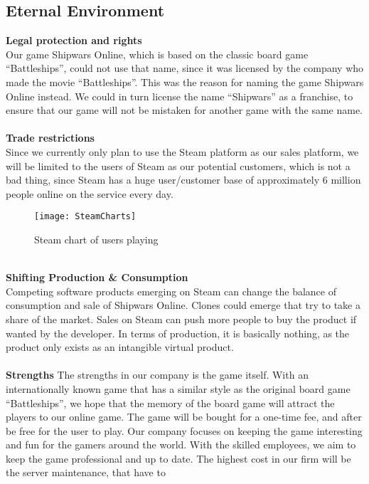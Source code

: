 	\subsection{Eternal Environment}
	\textbf{Legal protection and rights}
	\\
	Our game Shipwars Online, which is based on the classic board game
   “Battleships”, could not use that name, since it was licensed by the
   company who made the movie “Battleships”. This was the reason for naming
    the game Shipwars Online instead. We could in turn license the name
     “Shipwars” as a franchise, to ensure that our game will not be mistaken
      for another game with the same name.
	\\
	\\
	\textbf{Trade restrictions}
	\\
	Since we currently only plan to use the Steam platform as our sales
  platform, we will be limited to the users of Steam as our potential
  customers, which is not a bad thing, since Steam has a huge user/customer
  base of approximately 6 million people online on the service every day.
	\\
	\begin{figure}[h]
	\centerline{\texttt{[image: SteamCharts]}}
	\caption{Steam chart of users playing}
	\end{figure}
	\\
	\textbf{Shifting Production \& Consumption}
	\\
	Competing software products emerging on Steam can change the balance of
   consumption and sale of Shipwars Online. Clones could emerge that try to
    take a share of the market. Sales on Steam can push more people to buy
    the product if wanted by the developer. In terms of production, it is
    basically nothing, as the product only exists as an intangible virtual
     product.
	\\
	\\
	\textbf{Strengths}
	The strengths in our company is the game itself. With an internationally
  known game that has a similar style as the original board game
  “Battleships”, we hope that the memory of the board game will attract
  the players to our online game. The game will be bought for a one-time
   fee, and after be free for the user to play. Our company focuses on
    keeping the game interesting and fun for the gamers around the world.
     With the skilled employees, we aim to keep the game professional and
     up to date.
The highest cost in our firm will be the server maintenance, that have to
